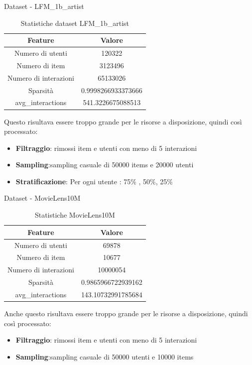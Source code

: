 
\begin{frame}{Dataset - LFM\_1b\_artist}
\footnotesize
\begin{table}[H]
\centering
\begin{tabular}{|c|c|}
\hline
\textbf{Feature} & \textbf{Valore} \\
\hline
Numero di utenti & 120322 \\
\hline
Numero di item & 3123496 \\
\hline
Numero di interazioni & 65133026 \\
\hline
Sparsità & 0.9998266933373666 \\
\hline
avg\_interactions & 541.3226675088513 \\
\hline
\end{tabular}
\caption{Statistiche dataset LFM\_1b\_artist}
\end{table}

    Questo risultava essere troppo grande per le risorse a disposizione, quindi così processato:
    \begin{itemize}
        \item  \textbf{Filtraggio}: rimossi item e utenti con meno di 5 interazioni
        \item  \textbf{Sampling}:sampling casuale di 50000 items e 20000 utenti
        \item \textbf{Stratificazione}: Per ogni utente : 75\% , 50\%, 25\%
    \end{itemize}
\end{frame}




\begin{frame}{Dataset - MovieLens10M}
\footnotesize
    \begin{table}[H]
    \centering
    \begin{tabular}{|c|c|}
    \hline
    \textbf{Feature} & \textbf{Valore} \\
    \hline
    Numero di utenti & 69878 \\
    \hline
    Numero di item & 10677 \\
    \hline
    Numero di interazioni & 10000054 \\
    \hline
    Sparsità & 0.9865966722939162 \\
    \hline
    avg\_interactions & 143.10732991785684 \\
    \hline
    \end{tabular}
    \caption{Statistiche MovieLens10M}
    \end{table}
        Anche questo risultava essere troppo grande per le risorse a disposizione, quindi così processato:
        \begin{itemize}
            \item  \textbf{Filtraggio}: rimossi item e utenti con meno di 5 interazioni
            \item  \textbf{Sampling}:sampling casuale di 50000 utenti e 10000 items
        \end{itemize}
    \end{frame}


